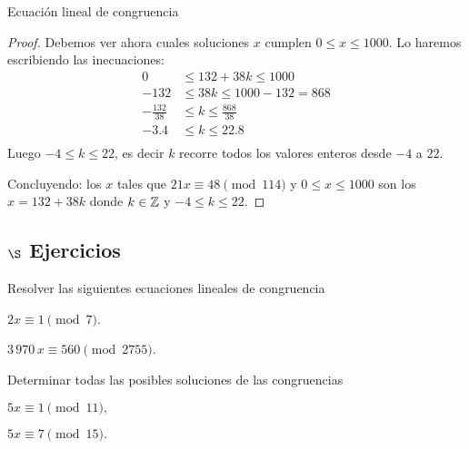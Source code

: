 \begin{section}{Ecuación lineal de congruencia}
\begin{proof}
    Debemos ver ahora cuales soluciones $x$ cumplen $0\le x \le 1000$. Lo haremos escribiendo las inecuaciones:
    \begin{align*}
    0&\le 132 + 38k \le 1000 \\
    -132&\le 38k \le 1000-132= 868 \\
    -\frac{132}{38}&\le k \le \frac{868}{38} \\
    -3.4&\le k \le 22.8 \\
    \end{align*}
    Luego $-4 \le k \le 22$,  es decir $k$  recorre todos los valores enteros desde $-4$  a $22$. 
    
    Concluyendo:   los  $x$ tales que   $21x\equiv  48 \pmod{114}$ y  $0 \le x \le 1000$ son los $x = 132 + 38k$ donde  $k \in {\mathbb Z}$ y $-4 \le k \le 22$.
    \end{proof}

\subsection*{$\S$ Ejercicios}

\begin{enumex}
    \item Resolver las siguientes ecuaciones lineales de congruencia
    \begin{enumex}
        \item $2x \equiv 1 \pmod{7}$.
        \item $3\,970\, x \equiv 560 \pmod{2755}$.
    \end{enumex}


    \item Determinar todas las posibles soluciones de las congruencias
    \begin{enumex}
        \item  $5x\equiv1 \pmod{11},$
        
        \item  $5x\equiv 7 \pmod{15}.$
    \end{enumex}



\end{enumex}
\end{section}
